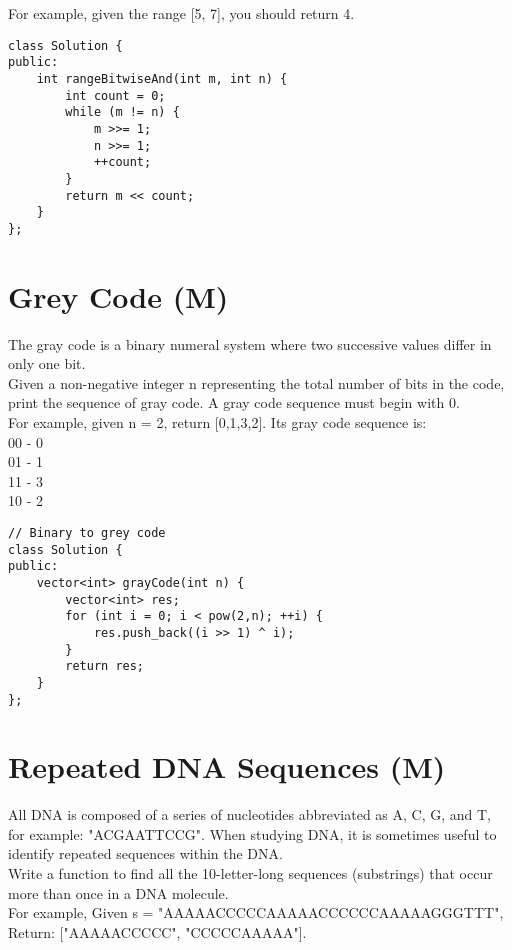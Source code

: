 For example, given the range [5, 7], you should return 4. \\

\begin{lstlisting}
class Solution {
public:
    int rangeBitwiseAnd(int m, int n) {
        int count = 0;
        while (m != n) {
            m >>= 1;
            n >>= 1;
            ++count;
        }
        return m << count;
    }
};
\end{lstlisting}


\section{Grey Code (M)}
The gray code is a binary numeral system where two successive values differ in only one bit.\\

Given a non-negative integer n representing the total number of bits in the code, print the sequence of gray code. A gray code sequence must begin with 0.\\

For example, given n = 2, return [0,1,3,2]. Its gray code sequence is:\\
00 - 0\\
01 - 1\\
11 - 3\\
10 - 2\\

\begin{lstlisting}
// Binary to grey code
class Solution {
public:
    vector<int> grayCode(int n) {
        vector<int> res;
        for (int i = 0; i < pow(2,n); ++i) {
            res.push_back((i >> 1) ^ i);
        }
        return res;
    }
};
\end{lstlisting}


\section{Repeated DNA Sequences (M)}
All DNA is composed of a series of nucleotides abbreviated as A, C, G, and T, for example: "ACGAATTCCG". When studying DNA, it is sometimes useful to identify repeated sequences within the DNA.\\

Write a function to find all the 10-letter-long sequences (substrings) that occur more than once in a DNA molecule.\\

For example,
Given s = "AAAAACCCCCAAAAACCCCCCAAAAAGGGTTT",
Return: ["AAAAACCCCC", "CCCCCAAAAA"].\\

